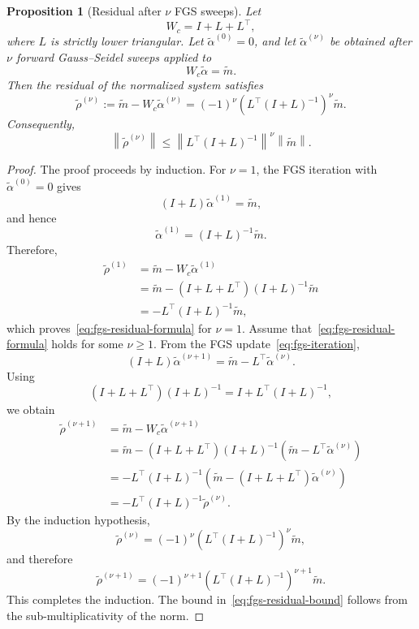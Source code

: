 \documentclass[10pt,a4paper]{amsart}
\newtheorem{proposition}{Proposition}
\begin{document}
\begin{proposition}[Residual after $\nu$ FGS sweeps]
\label{prop:fgs-residual}
Let
\[
W_c=I+L+L^\top,
\]
where $L$ is strictly lower triangular. Let
$\widetilde{\alpha}^{(0)}=0$, and let
$\widetilde{\alpha}^{(\nu)}$ be obtained after $\nu$ forward
Gauss--Seidel sweeps applied to
\[
W_c\widetilde{\alpha}=\widetilde{m}.
\]
Then the residual of the normalized system satisfies
\begin{equation}
\label{eq:fgs-residual-formula}
\widetilde{\rho}^{(\nu)}
:=
\widetilde{m}
-
W_c\widetilde{\alpha}^{(\nu)}
=
(-1)^\nu
\left(
L^\top(I+L)^{-1}
\right)^\nu
\widetilde{m}.
\end{equation}
Consequently,
\begin{equation}
\label{eq:fgs-residual-bound}
\left\|
\widetilde{\rho}^{(\nu)}
\right\|
\leq
\left\|
L^\top(I+L)^{-1}
\right\|^\nu
\left\|
\widetilde{m}
\right\|.
\end{equation}
\end{proposition}

\begin{proof}
The proof proceeds by induction. For $\nu=1$, the FGS iteration with
$\widetilde{\alpha}^{(0)}=0$ gives
\[
(I+L)\widetilde{\alpha}^{(1)}=\widetilde{m},
\]
and hence
\[
\widetilde{\alpha}^{(1)}
=
(I+L)^{-1}\widetilde{m}.
\]
Therefore,
\begin{align*}
\widetilde{\rho}^{(1)}
&=
\widetilde{m}
-
W_c\widetilde{\alpha}^{(1)}
\\
&=
\widetilde{m}
-
(I+L+L^\top)(I+L)^{-1}\widetilde{m}
\\
&=
-L^\top(I+L)^{-1}\widetilde{m},
\end{align*}
which proves~\eqref{eq:fgs-residual-formula} for $\nu=1$.
Assume that~\eqref{eq:fgs-residual-formula} holds for some $\nu\geq1$.
From the FGS update~\eqref{eq:fgs-iteration},
\[
(I+L)\widetilde{\alpha}^{(\nu+1)}
=
\widetilde{m}
-
L^\top\widetilde{\alpha}^{(\nu)}.
\]
Using
\[
(I+L+L^\top)(I+L)^{-1}
=
I+L^\top(I+L)^{-1},
\]
we obtain
\begin{align*}
\widetilde{\rho}^{(\nu+1)}
&=
\widetilde{m}
-
W_c\widetilde{\alpha}^{(\nu+1)}
\\
&=
\widetilde{m}
-
(I+L+L^\top)(I+L)^{-1}
\left(
\widetilde{m}
-
L^\top\widetilde{\alpha}^{(\nu)}
\right)
\\
&=
-L^\top(I+L)^{-1}
\left(
\widetilde{m}
-
(I+L+L^\top)\widetilde{\alpha}^{(\nu)}
\right)
\\
&=
-L^\top(I+L)^{-1}
\widetilde{\rho}^{(\nu)}.
\end{align*}
By the induction hypothesis,
\[
\widetilde{\rho}^{(\nu)}
=
(-1)^\nu
\left(
L^\top(I+L)^{-1}
\right)^\nu
\widetilde{m},
\]
and therefore
\[
\widetilde{\rho}^{(\nu+1)}
=
(-1)^{\nu+1}
\left(
L^\top(I+L)^{-1}
\right)^{\nu+1}
\widetilde{m}.
\]
This completes the induction. The bound
in~\eqref{eq:fgs-residual-bound} follows from the sub-multiplicativity
of the norm.
\end{proof}
\end{document}

